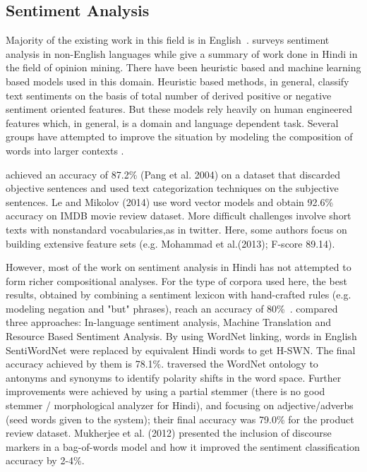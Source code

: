 \documentclass[11pt,a4paper]{article}
\begin{document}
\subsection{Sentiment Analysis}
Majority of the existing work in this field is in English~\cite{Liu:12}. \cite{Medagoda:13} surveys sentiment analysis in non-English languages while \cite{Sharma:14} give a summary of work done in Hindi in the field of opinion mining.
There have been heuristic based and machine learning based models used in this domain. Heuristic based methods, in general, classify text sentiments on the basis of total number of derived positive or negative sentiment oriented features. But these models rely heavily on human engineered features which, in general, is a domain and language dependent task. Several groups have attempted to improve the situation by modeling the composition of words into larger contexts \cite{Le:14,Socher:13,Johnson:14,Baroni:14}.

\cite{Pang:04} achieved an accuracy of 87.2\% (Pang et al. 2004) on a dataset that discarded objective sentences and used text categorization techniques on the subjective sentences. Le and Mikolov (2014) use word vector models and obtain 92.6\% accuracy on IMDB movie review dataset.  More difficult challenges involve short texts with nonstandard vocabularies,as in twitter.  Here, some authors focus on building extensive feature sets (e.g. Mohammad et al.(2013); F-score 89.14).

However, most of the work on sentiment analysis in Hindi has not attempted to form richer compositional analyses. For the type of corpora used here, the best results, obtained by combining a sentiment lexicon with hand-crafted rules (e.g. modeling negation and "but" phrases), reach an accuracy of 80\%~\cite{Mittal:13}. \cite{Joshi:10} compared three approaches: In-language sentiment
analysis, Machine Translation and Resource Based Sentiment Analysis. By using WordNet linking, words in English SentiWordNet were replaced by equivalent Hindi words to get H-SWN. The final accuracy achieved by them is 78.1\%. \cite{Bakliwal:12} traversed the WordNet ontology to antonyms and synonyms to identify polarity shifts in the word space. Further improvements were achieved by using a partial stemmer (there is no good stemmer / morphological analyzer for Hindi), and focusing on adjective/adverbs (seed words given to the system); their final accuracy was 79.0\% for the product review dataset. Mukherjee et al. (2012) presented the inclusion of discourse markers in a bag-of-words model and how it improved the sentiment classification accuracy by 2-4\%.
\end{document}
